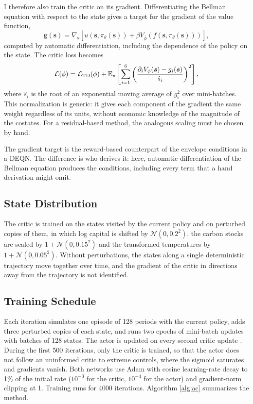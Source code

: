 I therefore also train the critic on its gradient. Differentiating the Bellman equation with respect to the state gives a target for the gradient of the value function,
\begin{equation}
    \bm{g}(\bm{s}) = \nabla_{\bm{s}}\left[u(\bm{s}, \pi_\theta(\bm{s})) + \beta V_{\bar\phi}\left(f(\bm{s}, \pi_\theta(\bm{s}))\right)\right],
\end{equation}
computed by automatic differentiation, including the dependence of the policy on the state. The critic loss becomes
\begin{equation}
    \mathcal{L}(\phi) = \mathcal{L}_{\text{TD}}(\phi) + \mathbb{E}_{\bm{s}}\left[\sum_{i=1}^{6}\left(\frac{\partial_i V_\phi(\bm{s}) - g_i(\bm{s})}{\hat{s}_i}\right)^2\right],
\end{equation}
where \(\hat{s}_i\) is the root of an exponential moving average of \(g_i^2\) over mini-batches. This normalization is generic: it gives each component of the gradient the same weight regardless of its units, without economic knowledge of the magnitude of the costates. For a residual-based method, the analogous scaling must be chosen by hand.

The gradient target is the reward-based counterpart of the envelope conditions in a DEQN. The difference is who derives it: here, automatic differentiation of the Bellman equation produces the conditions, including every term that a hand derivation might omit.

\subsection{State Distribution}

The critic is trained on the states visited by the current policy and on perturbed copies of them, in which log capital is shifted by \(\mathcal{N}(0, 0.2^2)\), the carbon stocks are scaled by \(1 + \mathcal{N}(0, 0.15^2)\) and the transformed temperatures by \(1 + \mathcal{N}(0, 0.05^2)\). Without perturbations, the states along a single deterministic trajectory move together over time, and the gradient of the critic in directions away from the trajectory is not identified.

\subsection{Training Schedule}

Each iteration simulates one episode of 128 periods with the current policy, adds three perturbed copies of each state, and runs two epochs of mini-batch updates with batches of 128 states. The actor is updated on every second critic update \parencite{Fujimoto2018TD3}. During the first 500 iterations, only the critic is trained, so that the actor does not follow an uninformed critic to extreme controls, where the sigmoid saturates and gradients vanish. Both networks use Adam \parencite{kingma2017adam} with cosine learning-rate decay to 1\% of the initial rate (\(10^{-3}\) for the critic, \(10^{-4}\) for the actor) and gradient-norm clipping at 1. Training runs for 4000 iterations. Algorithm \ref{alg:ac} summarizes the method.


